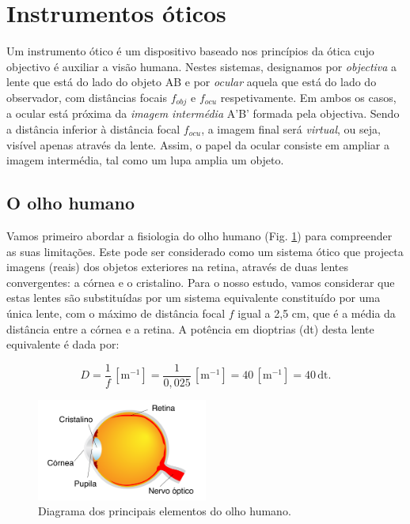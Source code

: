 \documentclass[12pt,a4paper,oneside]{paper}
\begin{document}


\section{\sf Instrumentos óticos}
Um instrumento ótico é um dispositivo baseado nos princípios da ótica cujo objectivo é auxiliar a visão humana. Nestes sistemas, designamos por \emph{objectiva} a lente que está do lado do objeto AB e por \emph{ocular} aquela que está do lado do observador, com distâncias focais $f_{obj}$ e $f_{ocu}$ respetivamente. Em ambos os casos, a ocular está  próxima da \emph{imagem intermédia} A'B' formada pela objectiva. Sendo a distância inferior à distância focal $f_{ocu}$, a imagem final será \emph{virtual}, ou seja, visível apenas através da lente.
Assim, o papel da ocular consiste em ampliar a imagem intermédia, tal como um lupa amplia um objeto.

\subsection{\sf O olho humano}
Vamos primeiro abordar a fisiologia do olho humano (Fig. \ref{fig:olho-1}) para compreender as suas limitações.
Este pode ser considerado como um sistema ótico que projecta imagens (reais) dos objetos exteriores na retina,
através de duas lentes convergentes: a córnea e o cristalino. Para o nosso estudo, vamos considerar que estas
lentes são substituídas por um sistema equivalente constituído por uma única lente, com o máximo de distância focal $f$
igual a 2,5 cm, que é a média da distância entre a córnea e a retina. A potência em dioptrias (dt) desta lente
equivalente é dada por:

\begin{equation}
D=\frac{1}{f} \,[\mathrm{m}^{-1}] = \frac{1}{0,025} \,[\mathrm{m}^{-1}] = 40 \,[\mathrm{m}^{-1}]=40\, \mathrm{dt}.
\end{equation}

\begin{figure}[H]
	\centering 
	\includegraphics[width=0.5\textwidth]{./otica_images/olho-1}
	\caption{Diagrama dos principais elementos do olho humano. \label{fig:olho-1}} 
\end{figure}
\end{document}
